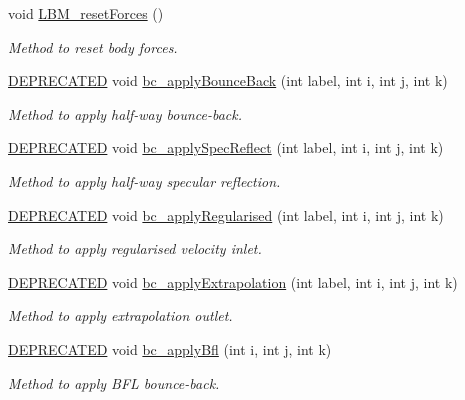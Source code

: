 \begin{DoxyCompactItemize}
void \hyperlink{class_grid_obj_a5701631be6333e512c7fc8dd6ecabf85}{L\+B\+M\+\_\+reset\+Forces} ()
\begin{DoxyCompactList}\small\item\em Method to reset body forces. \end{DoxyCompactList}\item 
\hyperlink{stdafx_8h_ac1e8a42306d8e67cb94ca31c3956ee78}{D\+E\+P\+R\+E\+C\+A\+T\+ED} void \hyperlink{class_grid_obj_a2dc94b1d2e3f14a1a086b8bfa078839b}{bc\+\_\+apply\+Bounce\+Back} (int label, int i, int j, int k)
\begin{DoxyCompactList}\small\item\em Method to apply half-\/way bounce-\/back. \end{DoxyCompactList}\item 
\hyperlink{stdafx_8h_ac1e8a42306d8e67cb94ca31c3956ee78}{D\+E\+P\+R\+E\+C\+A\+T\+ED} void \hyperlink{class_grid_obj_ae1d63a43d1dee6c7b25880c8a9bb97c9}{bc\+\_\+apply\+Spec\+Reflect} (int label, int i, int j, int k)
\begin{DoxyCompactList}\small\item\em Method to apply half-\/way specular reflection. \end{DoxyCompactList}\item 
\hyperlink{stdafx_8h_ac1e8a42306d8e67cb94ca31c3956ee78}{D\+E\+P\+R\+E\+C\+A\+T\+ED} void \hyperlink{class_grid_obj_a5602705b2575b09e27dd0065de3542f6}{bc\+\_\+apply\+Regularised} (int label, int i, int j, int k)
\begin{DoxyCompactList}\small\item\em Method to apply regularised velocity inlet. \end{DoxyCompactList}\item 
\hyperlink{stdafx_8h_ac1e8a42306d8e67cb94ca31c3956ee78}{D\+E\+P\+R\+E\+C\+A\+T\+ED} void \hyperlink{class_grid_obj_a385c4803f4803e380a520ac9b3dcb31d}{bc\+\_\+apply\+Extrapolation} (int label, int i, int j, int k)
\begin{DoxyCompactList}\small\item\em Method to apply extrapolation outlet. \end{DoxyCompactList}\item 
\hyperlink{stdafx_8h_ac1e8a42306d8e67cb94ca31c3956ee78}{D\+E\+P\+R\+E\+C\+A\+T\+ED} void \hyperlink{class_grid_obj_aeff3b54617b7ae65f08c96e653f9035f}{bc\+\_\+apply\+Bfl} (int i, int j, int k)
\begin{DoxyCompactList}\small\item\em Method to apply B\+FL bounce-\/back. \end{DoxyCompactList}\item 

\end{DoxyCompactItemize}
